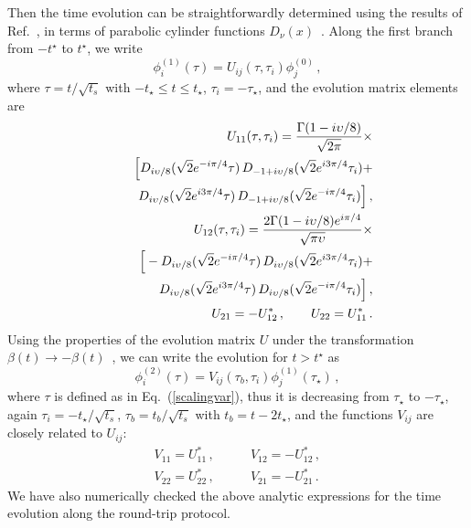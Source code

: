Then the time evolution can be straightforwardly determined using the
results of Ref.~\cite{vitanov1996landau}, in terms of parabolic cylinder functions
$D_\nu(x)$~\cite{Abrafunc}.  Along the first branch from $-t^\star$
  to $t^\star$, we write
\begin{equation}
  \phi_i^{(1)}(\tau) = U_{ij}(\tau,\tau_i) \phi_j^{(0)}\,,
  \label{fbev}
\end{equation}
where $\tau=t/\sqrt{t_s}$ with $-t_\star\le t\le t_\star$, $\tau_i
=-\tau_\star$, and the evolution matrix elements are~\cite{vitanov1996landau}
\begin{eqnarray}
&& U_{11}(\tau,\tau_i) = {\Gamma(1-i\upsilon/8)\over \sqrt{2\pi}}
  \times \label{uij}\\ && \quad \Big[
    D_{i\upsilon/8}(\sqrt{2}e^{-i\pi/4}\tau)\,
    D_{-1+i\upsilon/8}(\sqrt{2}e^{i3\pi/4}\tau_i) + \nonumber\\ &&\quad
    \;\;\; D_{i\upsilon/8}(\sqrt{2}e^{i3\pi/4}\tau)\,
    D_{-1+i\upsilon/8}(\sqrt{2}e^{-i\pi/4}\tau_i) \Big]\,, \nonumber
  \\ && U_{12}(\tau,\tau_i) = {2\Gamma(1-i\upsilon/8)e^{i\pi/4}\over
    \sqrt{\pi\upsilon}} \times \nonumber\\ && \quad \Big[ 
    -D_{i\upsilon/8}(\sqrt{2}e^{-i\pi/4}\tau)\,
    D_{i\upsilon/8}(\sqrt{2}e^{i3\pi/4}\tau_i) + \nonumber\\ && \quad 
    \;\;\; D_{i\upsilon/8}(\sqrt{2}e^{i3\pi/4}\tau)\,
      D_{i\upsilon/8}(\sqrt{2}e^{-i\pi/4}\tau_i)
      \Big]\,,\nonumber\\
    &&U_{21} = - U_{12}^*\,, \qquad U_{22} = U_{11}^*\,.
    \nonumber
\end{eqnarray}
Using the properties of the evolution matrix $U$ under the
transformation $\beta(t)\to -\beta(t)$~\cite{vitanov1996landau}, we can write the
evolution for $t>t^\star$ as
\begin{equation}
  \phi_i^{(2)}(\tau) = V_{ij}(\tau_b,\tau_i)\phi_j^{(1)}(\tau_\star)\,,
  \label{bev}
  \end{equation}
where $\tau$ is defined as in Eq.~(\ref{scalingvar}), thus it is
decreasing from $\tau_\star$ to $-\tau_\star$, again
$\tau_i=-t_\star/\sqrt{t_s}$, $\tau_b=t_b/\sqrt{t_s}$ with
$t_b=t-2t_\star$, and the functions $V_{ij}$ are closely related to
$U_{ij}$:~\cite{vitanov1996landau}
\begin{eqnarray}
  &V_{11} = U_{11}^*\,,\qquad
  &V_{12}= - U_{12}^*\,, \label{velmm}\\
&V_{22}= U_{22}^*\,,\qquad  &V_{21}=
  -U_{21}^*\,. \quad 
  \nonumber
  \end{eqnarray}
We have also numerically checked the above analytic expressions for
the time evolution along the round-trip protocol.


